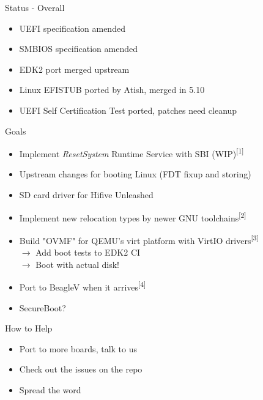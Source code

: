 \documentclass[
  10pt
]{beamer}
\begin{document}
\begin{frame}{Status - Overall}
  \begin{itemize}
    \item UEFI specification amended
    \item SMBIOS specification amended
    \item EDK2 port merged upstream
    \item Linux EFISTUB ported by Atish, merged in 5.10
    \item UEFI Self Certification Test ported, patches need cleanup
  \end{itemize}
\end{frame}

\begin{frame}{Goals}
  \begin{itemize}
    \item Implement \textit{ResetSystem} Runtime Service with SBI (WIP)\textsuperscript{\tiny [1]}
    \item Upstream changes for booting Linux (FDT fixup and storing)
    \item SD card driver for Hifive Unleashed
    \item Implement new relocation types by newer GNU toolchains\textsuperscript{\tiny [2]}
    \item Build "OVMF" for QEMU's virt platform with VirtIO drivers\textsuperscript{\tiny [3]} \\
          $\rightarrow$ Add boot tests to EDK2 CI \\
          $\rightarrow$ Boot with actual disk! \\
    \item Port to BeagleV when it arrives\textsuperscript{\tiny [4]}
    \item SecureBoot?
  \end{itemize}
\end{frame}

\begin{frame}{How to Help}
  \begin{itemize}
    \item Port to more boards, talk to us
    \item Check out the issues on the repo
    \item Spread the word
  \end{itemize}
\end{frame}
\end{document}
